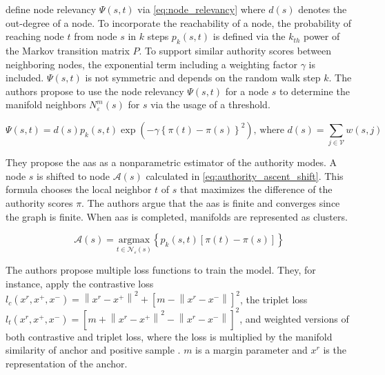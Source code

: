 \citet{mode_seeking_2012} define node relevancy $\Psi(s,t)$ via \eqref{eq:node_relevancy} where $d(s)$ denotes the out-degree of a node.
To incorporate the reachability of a node, the probability of reaching node $t$ from node $s$ in $k$ steps $p_k(s,t)$ is 
defined via the $k_{th}$ power of the Markov transition matrix $P$.
To support similar authority scores between neighboring nodes, the exponential term including a weighting factor $\gamma$ is included.
$\Psi(s,t)$ is not symmetric and depends on the random walk step $k$.
The authors propose to use the node relevancy $\Psi(s,t)$ for a node $s$ to determine the manifold neighbors $N_\varepsilon^m(s)$ for $s$ via the usage of a threshold.

\begin{equation}
    \Psi(s,t) = d(s) p_k(s,t) \exp(-\gamma \left\{  \pi(t) - \pi(s)  \right\}^2)\text{, where } d(s) = \sum_{j\in \mathcal{V}}^{}w(s,j)
    \label{eq:node_relevancy}
\end{equation}

They propose the \ac{aas} as a nonparametric estimator of the authority modes.
A node $s$ is shifted to node $\mathcal{A}(s)$ calculated in \eqref{eq:authority_ascent_shift}. 
This formula chooses the local neighbor $t$ of $s$ that maximizes the difference of the authority scores $\pi$.
The authors argue that the \ac{aas} is finite and converges since the graph is finite.
When \ac{aas} is completed, manifolds are represented as clusters.

\begin{equation}
    \mathcal{A}(s) = \underset{t \in \mathcal{N_\varepsilon}(s)}{\text{argmax}} \left\{ p_k(s,t)\left[ \pi(t)-\pi(s) \right] \right\}
    \label{eq:authority_ascent_shift}
\end{equation}



The authors propose multiple loss functions to train the model.
They, for instance, apply the contrastive loss $l_c(x^r, x^+, x^-)= \left\| x^r - x^+ \right\|^2 + \left[ m - \left\| x^r - x^- \right\| \right]^2$, 
the triplet loss $l_t(x^r, x^+, x^-)= \left[ m +  \left\| x^r - x^+ \right\| ^2 - \left\| x^r - x^- \right\| \right]^2$, 
and weighted versions of both contrastive and triplet loss, where the loss is multiplied by the manifold similarity of anchor and positive sample \citet{mining_manifolds_2018}.
$m$ is a margin parameter and $x^r$ is the representation of the anchor.

